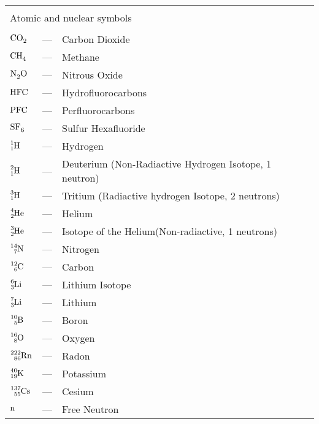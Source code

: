 \begin{longtable}{p{25mm} c p{120mm} }
\\
\\
\multicolumn{3}{l}{Atomic and nuclear symbols}\\
\\
$\ce{CO_2}$ & --- & Carbon Dioxide\\
$\ce{CH_4}$ & --- & Methane\\
$\ce{N_2 O}$ & --- & Nitrous Oxide\\
$\ce{HFC}$ & --- & Hydrofluorocarbons\\
$\ce{PFC}$ & --- & Perfluorocarbons\\
$\ce{SF_6}$ & --- & Sulfur Hexafluoride\\
$\ce{^{1}_{1}H}$ & --- & Hydrogen\\
$\ce{^{2}_{1}H}$ & --- & Deuterium (Non-Radiactive Hydrogen Isotope, 1 neutron)\\
$\ce{^{3}_{1}H}$ & --- & Tritium (Radiactive hydrogen Isotope, 2 neutrons)\\
$\ce{^{4}_{2}He}$ & --- & Helium\\
$\ce{^{3}_{2}He}$ & --- & Isotope of the Helium(Non-radiactive, 1 neutrons)\\
$\ce{^{14}_{7}N}$ & --- & Nitrogen\\
$\ce{^{12}_{6}C}$ & --- & Carbon\\
$\ce{^{6}_{3}Li}$ & --- & Lithium Isotope\\
$\ce{^{7}_{3}Li}$ & --- & Lithium\\
$\ce{^{10}_{5}B}$ & --- & Boron\\
$\ce{^{16}_{8}O}$ & --- & Oxygen\\
$\ce{^{222}_{86}Rn}$ & --- & Radon\\
$\ce{^{40}_{19}K}$ & --- & Potassium\\
$\ce{^{137}_{55}Cs}$ & --- & Cesium\\
$\ce{n}$ & --- & Free Neutron\\

\end{longtable}
